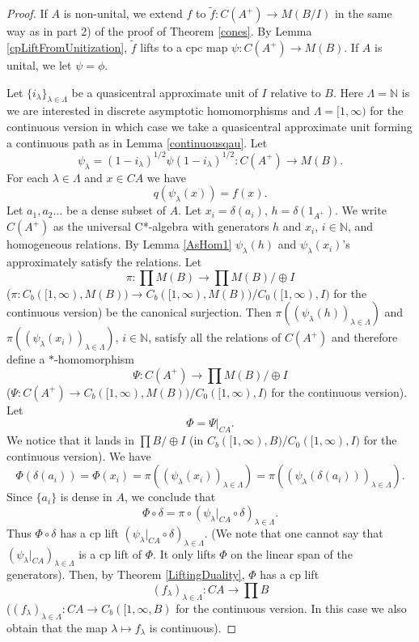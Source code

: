 \documentclass[10pt,a4paper]{amsart}
\begin{document}
  \begin{proof} If $A$ is non-unital, we extend $f$ to $\tilde f: C(A^+)\to M(B/I)$ in the same way as in part 2) of the proof of Theorem \ref{cones}.
  By Lemma \ref{cpLiftFromUnitization}, $\tilde f$ lifts to a cpc map $ \psi: C(A^+)\to M(B)$. If $A$ is unital, we let $\psi = \phi$.



  Let $\{i_{\lambda}\}_{\lambda\in \Lambda}$ be  a quasicentral approximate unit of $I$ relative to $B$. Here $\Lambda=\mathbb N$ is we are interested in discrete asymptotic homomorphisms and $\Lambda = [1, \infty)$ for the continuous version in which case we take a quasicentral approximate unit forming a continuous path as in Lemma \ref{continuousqau}.
Let $$\psi_{\lambda} = (1-i_{\lambda})^{1/2} \psi (1-i_{\lambda})^{1/2}: C(A^+)\to M(B).$$ For each $\lambda\in \Lambda$ and $x\in CA$ we have $$q(\psi_{\lambda}(x)) = f(x).$$
 Let  $ a_1, a_2 \ldots$ be a dense subset of $A$. Let $x_i = \delta(a_i)$, $h = \delta(1_{A^+})$.
We write $C(A^+)$ as the universal C*-algebra with generators $h$ and $x_i$, $i\in \mathbb N$, and homogeneous relations.   By Lemma \ref{AsHom1}  $\psi_{\lambda}(h)$ and $\psi_{\lambda}(x_i)$'s approximately satisfy the relations.  Let $$\pi: \prod M(B) \to \prod M(B) /\oplus I$$ ($\pi: C_b([1, \infty), M(B))\to C_b([1, \infty), M(B))/C_0([1, \infty), I)$ for the continuous version) be the canonical surjection. Then $\pi\left((\psi_{\lambda}(h))_{\lambda\in \Lambda}\right)$ and  $\pi\left((\psi_{\lambda}(x_i))_{\lambda\in \Lambda}\right)$, $i\in \mathbb N$, satisfy all the relations of $C(A^+)$ and therefore define a $\ast$-homomorphism
$$\Psi: C(A^+) \to \prod M(B)/\oplus I$$ ($\Psi: C(A^+) \to C_b([1, \infty), M(B))/C_0([1, \infty), I)$ for the continuous version). Let
$$\Phi = \Psi|_{CA}.$$ We notice that it lands in $\prod B/\oplus I$ (in $C_b([1, \infty), B)/C_0([1, \infty), I)$ for the continuous version). We have
$$\Phi(\delta(a_i)) = \Phi(x_i) = \pi\left((\psi_{\lambda}(x_i))_{\lambda\in \Lambda}\right) =  \pi\left((\psi_{\lambda}(\delta(a_i)))_{\lambda\in \Lambda}\right). $$ Since $\{a_i\}$ is dense in $A$, we conclude that
$$\Phi\circ \delta =\pi\circ \left(\psi_{\lambda}|_{CA}\circ \delta\right)_{\lambda\in \Lambda}.$$
Thus $\Phi\circ \delta$ has a cp lift $\left(\psi_{\lambda}|_{CA}\circ \delta\right)_{\lambda\in \Lambda}$. (We note that one cannot say that $\left(\psi_{\lambda}|_{CA}\right)_{\lambda\in \Lambda}$ is a cp lift of $\Phi$. It only lifts $\Phi$ on the linear span of the generators). Then, by Theorem \ref{LiftingDuality}, $\Phi$ has a cp lift
 $$\left(f_{\lambda}\right)_{\lambda\in\Lambda}: CA \to \prod B$$ ($\left(f_{\lambda}\right)_{\lambda\in\Lambda}: CA \to C_b([1, \infty, B)$ for the continuous version. In this case we also obtain that the map $\lambda\mapsto f_{\lambda}$ is continuous).




\end{proof}
\end{document}
